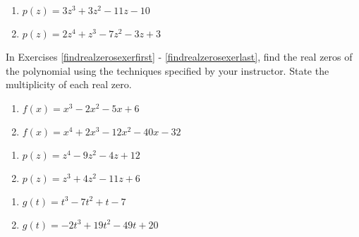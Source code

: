 \begin{multicols}{2}
\begin{enumerate}
\setcounter{enumi}{\value{HW}}

\item $p(z) = 3z^{3} + 3z^{2} - 11z - 10$
\item $p(z) = 2z^4+z^3-7z^2-3z+3$ \label{prelimpolystufflast}


\setcounter{HW}{\value{enumi}}
\end{enumerate}
\end{multicols}


In Exercises \ref{findrealzerosexerfirst} - \ref{findrealzerosexerlast}, find the real zeros of the polynomial using the techniques specified by your instructor.  State the multiplicity of each real zero.


\begin{multicols}{2}
\begin{enumerate}
\setcounter{enumi}{\value{HW}}

\item $f(x) = x^{3} - 2x^{2} - 5x + 6$ \label{findrealzerosexerfirst}
\item $f(x) = x^{4} + 2x^{3} - 12x^{2} - 40x - 32$

\setcounter{HW}{\value{enumi}}
\end{enumerate}
\end{multicols}

\begin{multicols}{2}
\begin{enumerate}
\setcounter{enumi}{\value{HW}}

\item $p(z) = z^{4} - 9z^{2} - 4z + 12$
\item $p(z) = z^{3} + 4z^{2} - 11z + 6$

\setcounter{HW}{\value{enumi}}
\end{enumerate}
\end{multicols}

\begin{multicols}{2}
\begin{enumerate}
\setcounter{enumi}{\value{HW}}

\item $g(t) = t^{3} - 7t^{2} + t - 7$
\item $g(t) = -2t^{3} + 19t^{2} - 49t + 20$

\setcounter{HW}{\value{enumi}}
\end{enumerate}
\end{multicols}

